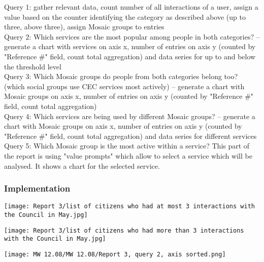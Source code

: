 Query 1: gather relevant data, count number of all interactions of a user, assign a value based on the counter identifying the category as described above (up to three, above three), assign Mosaic groups to entries\\
Query 2: Which services are the most popular among people in both categories? – generate a chart with services on axis x, number of entries on axis y (counted by "Reference \#" field, count total aggregation) and data series for up to and below the threshold level\\
Query 3: Which Mosaic groups do people from both categories belong too? (which social groups use CEC services most actively) – generate a chart with Mosaic groups on axis x, number of entries on axis y (counted by "Reference \#" field, count total aggregation)\\
Query 4: Which services are being used by different Mosaic groups? – generate a chart with Mosaic groups on axis x, number of entries on axis y (counted by "Reference \#" field, count total aggregation) and data series for different services\\
Query 5: Which Mosaic group is the most active within a service? This part of the report is using "value prompts" which allow to select a service which will be analysed. It shows a chart for the selected service.
			
			\subsubsection{Implementation}
			
			
\begin{center}
  \texttt{[image: Report 3/list of citizens who had at most 3 interactions with the Council in May.jpg]}
\end{center}
			

\begin{center}
  \texttt{[image: Report 3/list of citizens who had more than 3 interactions with the Council in May.jpg]}
\end{center}



\begin{center}
  \texttt{[image: MW 12.08/MW 12.08/Report 3, query 2, axis sorted.png]}
\end{center}


